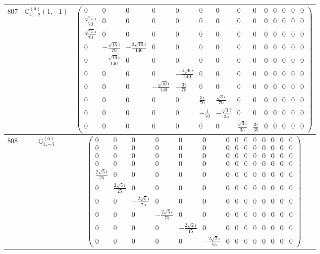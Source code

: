 \documentclass[fleqn,8pt,landscape]{jsarticle}
\begin{document}
\begin{center}
\begin{longtable}{ccc}
$ 807 $ & $ \mathbb{G}_{4,-2}^{(a)}(1,-1) $ & $ \begin{pmatrix} 0 & 0 & 0 & 0 & 0 & 0 & 0 & 0 & 0 & 0 & 0 & 0 & 0 & 0 \\ \frac{\sqrt{15} i}{70} & 0 & 0 & 0 & 0 & 0 & 0 & 0 & 0 & 0 & 0 & 0 & 0 & 0 \\ \frac{\sqrt{15} i}{70} & 0 & 0 & 0 & 0 & 0 & 0 & 0 & 0 & 0 & 0 & 0 & 0 & 0 \\ 0 & - \frac{\sqrt{15} i}{70} & - \frac{3 \sqrt{10} i}{140} & 0 & 0 & 0 & 0 & 0 & 0 & 0 & 0 & 0 & 0 & 0 \\ 0 & - \frac{\sqrt{10} i}{140} & 0 & 0 & 0 & 0 & 0 & 0 & 0 & 0 & 0 & 0 & 0 & 0 \\ 0 & 0 & 0 & 0 & - \frac{3 \sqrt{6} i}{140} & 0 & 0 & 0 & 0 & 0 & 0 & 0 & 0 & 0 \\ 0 & 0 & 0 & - \frac{\sqrt{10} i}{140} & - \frac{3 i}{70} & 0 & 0 & 0 & 0 & 0 & 0 & 0 & 0 & 0 \\ 0 & 0 & 0 & 0 & 0 & \frac{3 i}{70} & \frac{\sqrt{3} i}{70} & 0 & 0 & 0 & 0 & 0 & 0 & 0 \\ 0 & 0 & 0 & 0 & 0 & - \frac{i}{70} & - \frac{\sqrt{3} i}{35} & 0 & 0 & 0 & 0 & 0 & 0 & 0 \\ 0 & 0 & 0 & 0 & 0 & 0 & 0 & \frac{\sqrt{3} i}{35} & \frac{3 i}{35} & 0 & 0 & 0 & 0 & 0 \end{pmatrix} $ \\ \hline
$ 808 $ & $ \mathbb{G}_{4,-3}^{(a)} $ & $ \begin{pmatrix} 0 & 0 & 0 & 0 & 0 & 0 & 0 & 0 & 0 & 0 & 0 & 0 & 0 & 0 \\ 0 & 0 & 0 & 0 & 0 & 0 & 0 & 0 & 0 & 0 & 0 & 0 & 0 & 0 \\ 0 & 0 & 0 & 0 & 0 & 0 & 0 & 0 & 0 & 0 & 0 & 0 & 0 & 0 \\ 0 & 0 & 0 & 0 & 0 & 0 & 0 & 0 & 0 & 0 & 0 & 0 & 0 & 0 \\ \frac{2 \sqrt{5} i}{25} & 0 & 0 & 0 & 0 & 0 & 0 & 0 & 0 & 0 & 0 & 0 & 0 & 0 \\ 0 & \frac{2 \sqrt{5} i}{25} & 0 & 0 & 0 & 0 & 0 & 0 & 0 & 0 & 0 & 0 & 0 & 0 \\ 0 & 0 & - \frac{2 \sqrt{5} i}{75} & 0 & 0 & 0 & 0 & 0 & 0 & 0 & 0 & 0 & 0 & 0 \\ 0 & 0 & 0 & - \frac{2 \sqrt{5} i}{75} & 0 & 0 & 0 & 0 & 0 & 0 & 0 & 0 & 0 & 0 \\ 0 & 0 & 0 & 0 & - \frac{2 \sqrt{2} i}{15} & 0 & 0 & 0 & 0 & 0 & 0 & 0 & 0 & 0 \\ 0 & 0 & 0 & 0 & 0 & - \frac{2 \sqrt{2} i}{15} & 0 & 0 & 0 & 0 & 0 & 0 & 0 & 0 \end{pmatrix} $ \\ \hline

\end{longtable}
\end{center}
\end{document}
